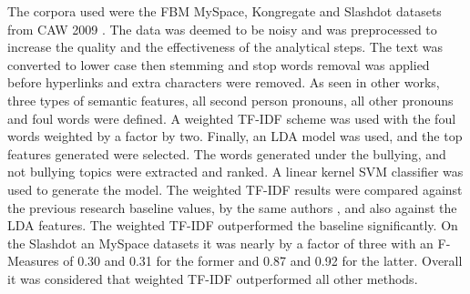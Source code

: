 The corpora used were the FBM MySpace, Kongregate and Slashdot datasets from CAW 2009 \cite{fundacion_barcelona_media_fbm_caw_2009}. The data was deemed to be noisy and was preprocessed to increase the quality and the effectiveness of the analytical steps. The text was converted to lower case then stemming and stop words removal was applied before hyperlinks and extra characters were removed. As seen in other works, three types of semantic features, all second person pronouns, all other pronouns and foul words were defined. A weighted TF-IDF scheme was used with the foul words weighted by a factor by two. Finally, an LDA model was used, and the top features generated were selected. The words generated under the bullying, and not bullying topics were extracted and ranked. A linear kernel SVM classifier was used to generate the model. The weighted TF-IDF results were compared against the previous research baseline values, by the same authors \cite{nahar_sentiment_2012}, and also against the LDA features. The weighted TF-IDF outperformed the baseline significantly. On the Slashdot an MySpace datasets it was nearly by a factor of three with an F-Measures of 0.30 and 0.31 for the former and 0.87 and 0.92 for the latter.  Overall it was considered that weighted TF-IDF outperformed all other methods.

